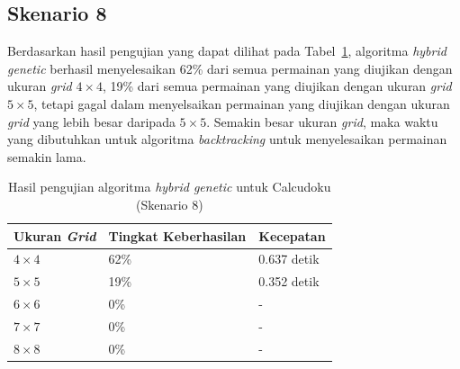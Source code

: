 \subsection{Skenario 8}
\label{sec:skenario8}

Berdasarkan hasil pengujian yang dapat dilihat pada Tabel~\ref{tab:pengujianhg8}, algoritma \textit{hybrid genetic} berhasil menyelesaikan 62\% dari semua permainan yang diujikan dengan ukuran \textit{grid} \begin{math}4 \times 4\end{math}, 19\% dari semua permainan yang diujikan dengan ukuran \textit{grid} \begin{math}5 \times 5\end{math}, tetapi gagal dalam menyelsaikan permainan yang diujikan dengan ukuran \textit{grid} yang lebih besar daripada \begin{math}5 \times 5\end{math}. Semakin besar ukuran \textit{grid}, maka waktu yang dibutuhkan untuk algoritma \textit{backtracking} untuk menyelesaikan permainan semakin lama.

\begin{table}
\centering
\captionsetup{justification=centering}
\caption[Hasil pengujian algoritma \textit{hybrid genetic} untuk Calcudoku (Skenario 8)]{Hasil pengujian algoritma \textit{hybrid genetic} untuk Calcudoku (Skenario 8)}
\begin{tabular}{| l | l | l |}
\hline
Ukuran \textit{Grid} & Tingkat Keberhasilan & Kecepatan \\
\hline \hline
\begin{math}4 \times 4\end{math} & 62\% & 0.637 detik \\
\hline
\begin{math}5 \times 5\end{math} & 19\% & 0.352 detik \\
\hline
\begin{math}6 \times 6\end{math} & 0\% & - \\
\hline
\begin{math}7 \times 7\end{math} & 0\% & - \\
\hline
\begin{math}8 \times 8\end{math} & 0\% & - \\
\hline
\end{tabular}
\label{tab:pengujianhg8}
\end{table}

